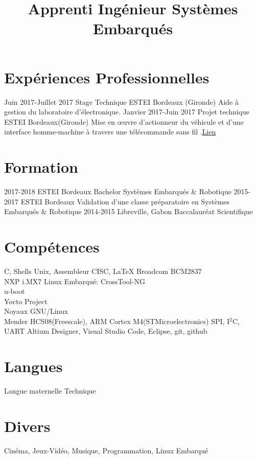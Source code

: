 \documentclass[10pts,a4paper,sans]{moderncv}
\title{Apprenti Ingénieur Systèmes Embarqués }
\begin{document}
\maketitle

\section{Expériences Professionnelles}
\cventry{} {Juin 2017-Juillet 2017} {Stage Technique} {ESTEI} {Bordeaux (Gironde)} {Aide à gestion du laboratoire d’électronique.} {}
\cventry{} {Janvier 2017-Juin 2017} {Projet technique} {ESTEI} {Bordeaux(Gironde)} {Mise en œuvre d'actionneur du véhicule et d'une interface homme-machine à travers une télécommande sans fil .\href{https://github.com/jorisoffouga/projet_vehicule_interactif_B2}{Lien}}
{} {}

\section{Formation}
\cventry{} {2017-2018} {ESTEI} {Bordeaux} {Bachelor Systèmes Embarqués \& Robotique} {}
\cventry{} {2015-2017} {ESTEI} {Bordeaux} {Validation d'une classe préparatoire en Systèmes Embarqués \& Robotique} {}
\cventry{} {2014-2015} {Libreville, Gabon} {Baccalauréat Scientifique} {} {}

\section{Compétences}
 {C, Shells Unix, Assembleur CISC, \LaTeX} 
 {Broadcom BCM2837 \\ NXP i.MX7} {Linux Embarqué:}{ 
	CrossTool-NG
	\\ u-boot
	\\ Yocto Project 
	\\ Noyaux GNU/Linux
	\\ Mender
}
 {HCS08(Freescale), ARM Cortex M4(STMicroelectronics)}
 {SPI, I$^{2}$C, UART} 
 {Altium Designer, Visual Studio Code, Eclipse, git, github }
\section{Langues}
 {Langue maternelle}
 {Technique}
 
\section{Divers}
 {Cinéma, Jeux-Vidéo, Musique, Programmation, Linux Embarqué}
\end{document}
